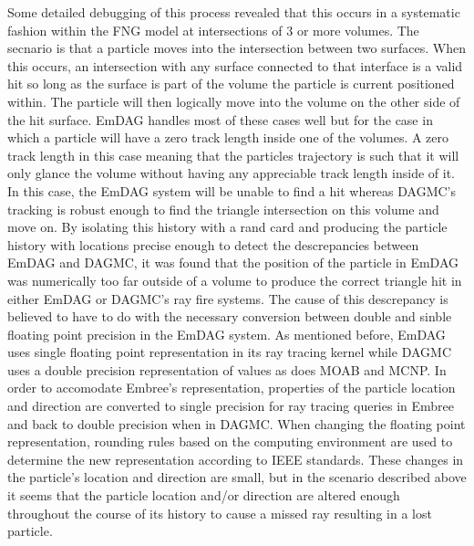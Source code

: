 \documentclass[12pt, a4paper]{article}
\begin{document}
Some detailed debugging of this process revealed that this occurs in a systematic fashion within the FNG model at intersections of 3 or more volumes. The secnario is that a particle moves into the intersection between two surfaces. When this occurs, an intersection with any surface connected to that interface is a valid hit so long as the surface is part of the volume the particle is current positioned within. The particle will then logically move into the volume on the other side of the hit surface. EmDAG handles most of these cases well but for the case in which a particle will have a zero track length inside one of the volumes. A zero track length in this case meaning that the particles trajectory is such that it will only glance the volume without having any appreciable track length inside of it. In this case, the EmDAG system will be unable to find a hit whereas DAGMC's tracking is robust enough to find the triangle intersection on this volume and move on. By isolating this history with a rand card and producing the particle history with locations precise enough to detect the descrepancies between EmDAG and DAGMC, it was found that the position of the particle in EmDAG was numerically too far outside of a volume to produce the correct triangle hit in either EmDAG or DAGMC's ray fire systems. The cause of this descrepancy is believed to have to do with the necessary conversion between double and sinble floating point precision in the EmDAG system. As mentioned before, EmDAG uses single floating point representation in its ray tracing kernel while DAGMC uses a double precision representation of values as does MOAB and MCNP. In order to accomodate Embree's representation, properties of the particle location and direction are converted to single precision for ray tracing queries in Embree and back to double precision when in DAGMC. When changing the floating point representation, rounding rules based on the computing environment are used to determine the new representation according to IEEE standards. \cite{IEEE_STD_2008} These changes in the particle's location and direction are small, but in the scenario described above it seems that the particle location and/or direction are altered enough throughout the course of its history to cause a missed ray resulting in a lost particle.
\end{document}
